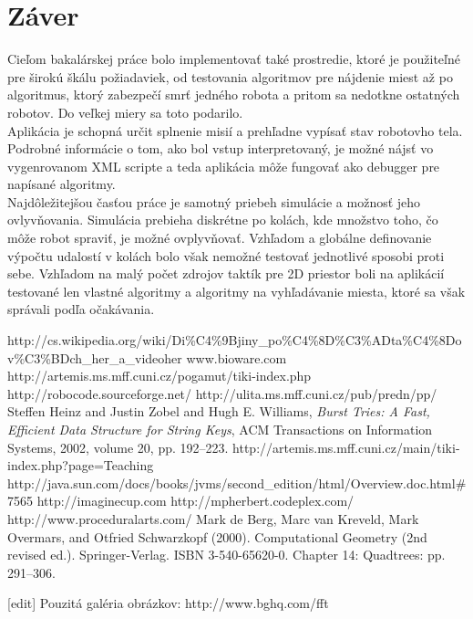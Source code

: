 \documentclass[12pt,notitlepage]{report}
\begin{document}
\chapter{Záver}
Cieľom bakalárskej práce bolo implementovať také prostredie, ktoré je použiteľné pre širokú škálu požiadaviek, od testovania algoritmov pre nájdenie miest až po algoritmus, ktorý zabezpečí smrť jedného robota a pritom sa nedotkne ostatných robotov. Do veľkej miery sa toto podarilo. \\
Aplikácia je schopná určit splnenie misií a prehľadne vypísať stav robotovho tela. Podrobné informácie o tom, ako bol vstup interpretovaný, je možné nájsť vo vygenrovanom XML scripte a teda aplikácia môže fungovať ako debugger pre napísané algoritmy.\\
Najdôležitejšou časťou práce je samotný priebeh simulácie a možnosť jeho ovlyvňovania. Simulácia prebieha diskrétne po kolách, kde množstvo toho, čo môže robot spraviť, je možné ovplyvňovať. Vzhľadom a globálne definovanie výpočtu udalostí v kolách bolo však nemožné testovať jednotlivé sposobi proti sebe.
Vzhľadom na malý počet zdrojov taktík pre 2D priestor boli na aplikácií testované len vlastné algoritmy a algoritmy na vyhľadávanie miesta, ktoré sa však správali podľa očakávania.\\

\newpage
{}
\begin{thebibliography}{99}
http://cs.wikipedia.org/wiki/Di\%C4\%9Bjiny\_po\%C4\%8D\%C3\%ADta\%C4\%8Dov\%C3\%BDch\_her\_a\_videoher
www.bioware.com
http://artemis.ms.mff.cuni.cz/pogamut/tiki-index.php
 http://robocode.sourceforge.net/
 http://ulita.ms.mff.cuni.cz/pub/predn/pp/
Steffen Heinz and Justin Zobel and Hugh E. Williams,
    \emph{Burst Tries: A Fast, Efficient Data Structure for String Keys},
    ACM Transactions on Information Systems, 2002,
    volume 20, pp. 192--223.
http://artemis.ms.mff.cuni.cz/main/tiki-index.php?page=Teaching
http://java.sun.com/docs/books/jvms/second\_edition/html/Overview.doc.html\#7565
http://imaginecup.com
http://mpherbert.codeplex.com/
http://www.proceduralarts.com/
   Mark de Berg, Marc van Kreveld, Mark Overmars, and Otfried Schwarzkopf (2000). Computational Geometry (2nd revised ed.). Springer-Verlag. ISBN 3-540-65620-0.  Chapter 14: Quadtrees: pp. 291–306.

[edit] 
 Pouzitá galéria obrázkov: http://www.bghq.com/fft 
\end{thebibliography}
\end{document}
